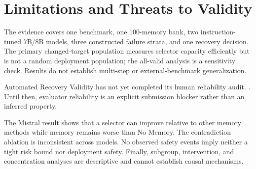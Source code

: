 \section{Limitations and Threats to Validity}

The evidence covers one benchmark, one 100-memory bank, two instruction-tuned 7B/8B models, three constructed failure strata, and one recovery decision. The primary changed-target population measures selector capacity efficiently but is not a random deployment population; the all-valid analysis is a sensitivity check. Results do not establish multi-step or external-benchmark generalization.

Automated Recovery Validity has not yet completed its human reliability audit. \todoVOne. Until then, evaluator reliability is an explicit submission blocker rather than an inferred property.

The Mistral result shows that a selector can improve relative to other memory methods while memory remains worse than No Memory. The contradiction ablation is inconsistent across models. No observed safety events imply neither a tight risk bound nor deployment safety. Finally, subgroup, intervention, and concentration analyses are descriptive and cannot establish causal mechanisms.

